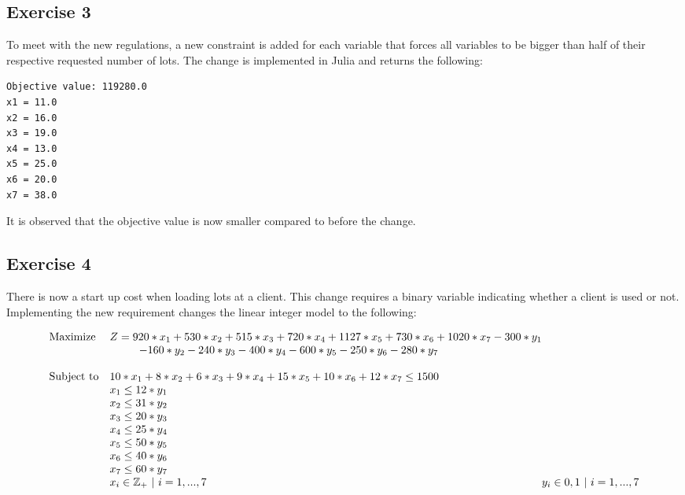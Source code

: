\documentclass{article}
\begin{document}
\subsection{Exercise 3}
To meet with the new regulations, a new constraint is added for each variable that forces all variables to be bigger than half of their respective requested number of lots.
The change is implemented in Julia and returns the following:

\begin{commandline}
  \begin{verbatim}
Objective value: 119280.0
x1 = 11.0
x2 = 16.0
x3 = 19.0
x4 = 13.0
x5 = 25.0
x6 = 20.0
x7 = 38.0
    \end{verbatim}
  \end{commandline}

It is observed that the objective value is now smaller compared to before the change.

\subsection{Exercise 4}

There is now a start up cost when loading lots at a client. 
This change requires a binary variable indicating whether a client is used or not.
Implementing the new requirement changes the linear integer model to the following:

\begin{equation*}
  \begin{array}{ll@{}ll}
  \text{Maximize}  & Z=920*x_1+530*x_2+515*x_3+720*x_4+1127*x_5+730*x_6+1020*x_7-300*y_1\\
                   & \ \ \ \ \ \ \ \ -160*y_2-240*y_3-400*y_4-600*y_5-250*y_6-280*y_7 \\
                   & \\
  \text{Subject to}& 10*x_1+8*x_2+6*x_3+9*x_4+15*x_5+10*x_6+12*x_7 \leq 1500\\
                   & x_1\leq 12*y_1 \\
                   & x_2\leq 31*y_2 \\
                   & x_3\leq 20*y_3 \\
                   & x_4\leq 25*y_4 \\
                   & x_5\leq 50*y_5 \\
                   & x_6\leq 40*y_6 \\
                   & x_7\leq 60*y_7 \\
                   & x_i\in \mathbb{Z_+}\ |\ i=1,...,7
                   & y_i\in {0,1}\ |\ i=1,...,7
  \end{array}
\end{equation*}
\end{document}

